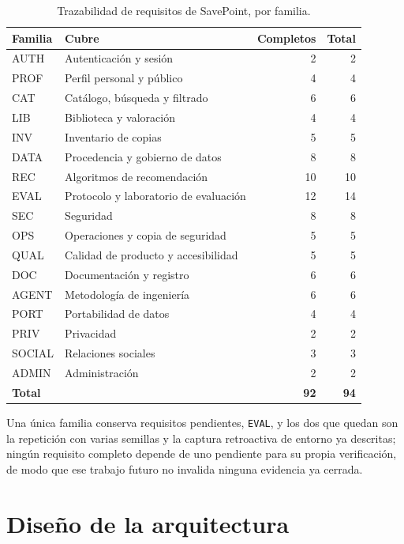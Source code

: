 \begin{table}[H]
\centering
\caption{Trazabilidad de requisitos de SavePoint, por familia.}\label{tab:trazabilidad-familias}
\tablecompact
\begin{tabularx}{\textwidth}{@{}>{\ttfamily\raggedright\arraybackslash}p{}Yrr@{}}
\textnormal{Familia} & \textnormal{Cubre} & \textnormal{Completos} & \textnormal{Total} \\
\hline
AUTH & Autenticación y sesión & 2 & 2 \\
PROF & Perfil personal y público & 4 & 4 \\
CAT & Catálogo, búsqueda y filtrado & 6 & 6 \\
LIB & Biblioteca y valoración & 4 & 4 \\
INV & Inventario de copias & 5 & 5 \\
DATA & Procedencia y gobierno de datos & 8 & 8 \\
REC & Algoritmos de recomendación & 10 & 10 \\
EVAL & Protocolo y laboratorio de evaluación & 12 & 14 \\
SEC & Seguridad & 8 & 8 \\
OPS & Operaciones y copia de seguridad & 5 & 5 \\
QUAL & Calidad de producto y accesibilidad & 5 & 5 \\
DOC & Documentación y registro & 6 & 6 \\
AGENT & Metodología de ingeniería & 6 & 6 \\
PORT & Portabilidad de datos & 4 & 4 \\
PRIV & Privacidad & 2 & 2 \\
SOCIAL & Relaciones sociales & 3 & 3 \\
ADMIN & Administración & 2 & 2 \\
\hline
\textbf{Total} & & \textbf{92} & \textbf{94} \\
\end{tabularx}
\end{table}

Una única familia conserva requisitos pendientes, \texttt{EVAL}, y los dos que quedan son la
repetición con varias semillas y la captura retroactiva de entorno ya descritas; ningún
requisito completo depende de uno pendiente para su propia verificación, de modo que ese
trabajo futuro no invalida ninguna evidencia ya cerrada.

\section{Diseño de la arquitectura}\label{sec:web-diseno}

